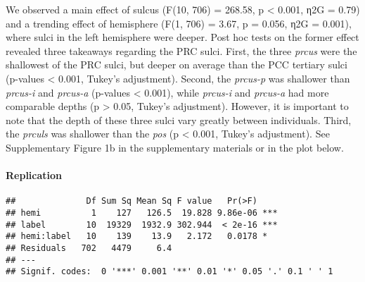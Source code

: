 \documentclass[
]{article}
\newenvironment{Shaded}{\begin{snugshade}}{\end{snugshade}}
\newcommand{\CommentTok}[1]{\textcolor[rgb]{0.56,0.35,0.01}{\textit{#1}}}
\newcommand{\DecValTok}[1]{\textcolor[rgb]{0.00,0.00,0.81}{#1}}
\newcommand{\KeywordTok}[1]{\textcolor[rgb]{0.13,0.29,0.53}{\textbf{#1}}}
\newcommand{\NormalTok}[1]{#1}
\newcommand{\OperatorTok}[1]{\textcolor[rgb]{0.81,0.36,0.00}{\textbf{#1}}}
\newcommand{\StringTok}[1]{\textcolor[rgb]{0.31,0.60,0.02}{#1}}
\begin{document}
We observed a main effect of sulcus (F(10, 706) = 268.58, p \textless{}
0.001, η2G = 0.79) and a trending effect of hemisphere (F(1, 706) =
3.67, p = 0.056, η2G = 0.001), where sulci in the left hemisphere were
deeper. Post hoc tests on the former effect revealed three takeaways
regarding the PRC sulci. First, the three \emph{prcus} were the
shallowest of the PRC sulci, but deeper on average than the PCC tertiary
sulci (p-values \textless{} 0.001, Tukey's adjustment). Second, the
\emph{prcus-p} was shallower than \emph{prcus-i} and \emph{prcus-a}
(p-values \textless{} 0.001), while \emph{prcus-i} and \emph{prcus-a}
had more comparable depths (p \textgreater{} 0.05, Tukey's adjustment).
However, it is important to note that the depth of these three sulci
vary greatly between individuals. Third, the \emph{prculs} was shallower
than the \emph{pos} (p \textless{} 0.001, Tukey's adjustment). See
Supplementary Figure 1b in the supplementary materials or in the plot
below.

\hypertarget{replication}{%
\paragraph{Replication}\label{replication}}

\begin{Shaded}
\end{Shaded}

\begin{verbatim}
##              Df Sum Sq Mean Sq F value   Pr(>F)    
## hemi          1    127   126.5  19.828 9.86e-06 ***
## label        10  19329  1932.9 302.944  < 2e-16 ***
## hemi:label   10    139    13.9   2.172   0.0178 *  
## Residuals   702   4479     6.4                     
## ---
## Signif. codes:  0 '***' 0.001 '**' 0.01 '*' 0.05 '.' 0.1 ' ' 1
\end{verbatim}
\end{document}
